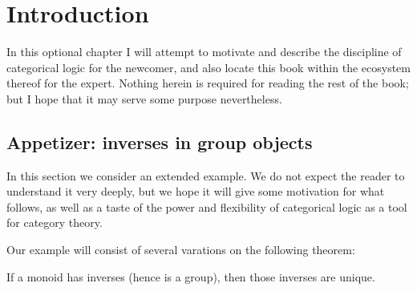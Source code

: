 \chapter{Introduction}
\label{chap:intro}



In this optional chapter I will attempt to motivate and describe the discipline of categorical logic for the newcomer, and also locate this book within the ecosystem thereof for the expert.
Nothing herein is required for reading the rest of the book; but I hope that it may serve some purpose nevertheless.


\section{Appetizer: inverses in group objects}
\label{sec:intro}

In this section we consider an extended example.
We do not expect the reader to understand it very deeply, but we hope it will give some motivation for what follows, as well as a taste of the power and flexibility of categorical logic as a tool for category theory.

Our example will consist of several varations on the following theorem:

\begin{thm}
  If a monoid has inverses (hence is a group), then those inverses are unique.
\end{thm}

